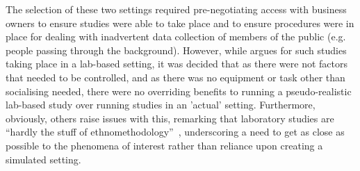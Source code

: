 \begin{revisedsubmission}
The selection of these two settings required pre-negotiating access with business owners to ensure studies were able to take place and to ensure procedures were in place for dealing with inadvertent data collection of members of the public (e.g. people passing through the background).
However, while \citet{Rooksby2013} argues for such studies taking place in a lab-based setting, it was decided that  as there were not factors that needed to be controlled, and as there was no equipment or task other than socialising needed, there were no overriding benefits to running a pseudo-realistic lab-based study over running studies in an 'actual' setting.
Furthermore, obviously, others raise issues with this, remarking that laboratory studies are ``hardly the stuff of ethnomethodology''~\citep[p. 8]{Dourish1998a}, underscoring a need to get as close as possible to the phenomena of interest rather than reliance upon creating a simulated setting.
\end{revisedsubmission}






